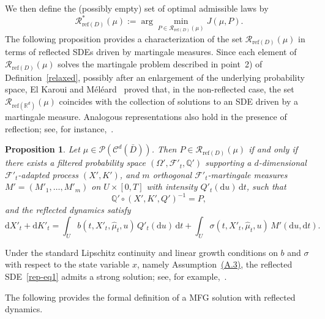 \documentclass[11pt,amsfonts]{article}
\theoremstyle{plain}
\newtheorem{proposition}{Proposition}
\theoremstyle{assumpstyle}
\numberwithin{equation}{section}
\numberwithin{theorem}{section}
\numberwithin{proposition}{section}
\numberwithin{definition}{section}
\numberwithin{remark}{section}
\numberwithin{corollary}{section}
\numberwithin{lemma}{section}
\begin{document}
\noindent We then define the (possibly empty) set of optimal admissible laws by
\begin{equation*}
\mathcal{R}_{\mathrm{ref}(D)}^*(\mu)
:= \arg\min_{P \in \mathcal{R}_{\mathrm{ref}(D)}(\mu)} J(\mu, P).
\end{equation*}
The following proposition provides a characterization of the set $\mathcal{R}_{\mathrm{ref}(D)}(\mu)$ in terms of reflected SDEs driven by martingale measures. Since each element of $\mathcal{R}_{\mathrm{ref}(D)}(\mu)$ solves the martingale problem described in point~2) of Definition~\ref{relaxed}, possibly after an enlargement of the underlying probability space, El Karoui and Méléard~\cite{Mel} proved that, in the non-reflected case, the set $\mathcal{R}_{\mathrm{ref}(\mathbb{R}^d)}(\mu)$ coincides with the collection of solutions to an SDE driven by a martingale measure. Analogous representations also hold in the presence of reflection; see, for instance,~\cite{kushnerbook}.
\begin{proposition} \label{rep martingale for Reflected dynamics}
Let $\mu \in \mathcal{P}(\mathcal{C}^{d}(\bar D))$. 
Then $P \in \mathcal{R}_{\mathrm{ref}(D)}(\mu)$ if and only if there exists a filtered probability space 
$(\Omega', \mathcal{F}'_t, \mathbb{Q}')$
supporting a $d$-dimensional $\mathcal{F}'_t$-adapted process $(X', K')$, 
and $m$ orthogonal $\mathcal{F}'_t$-martingale measures 
$M' = (M'_1, \ldots, M'_m)$ on $U \times [0, T]$ with intensity $Q'_t(\mathrm{d}u)\, \mathrm{d}t$, such that
\begin{equation*}
\mathbb{Q}' \circ (X', K', Q')^{-1} = P,
\end{equation*}
and the reflected dynamics satisfy
\begin{equation} \label{rep-eq1}
\mathrm{d}X'_t+ \mathrm{d}K'_t 
= \displaystyle\int_U b(t, X'_t, \hat{\mu}_t, u)\, Q'_t(\mathrm{d}u)\, \mathrm{d}t
+ \displaystyle\int_U \sigma(t, X'_t, \hat{\mu}_t, u)\, M'(\mathrm{d}u, \mathrm{d}t)
. 
\end{equation}
\end{proposition}
Under the standard Lipschitz continuity and linear growth conditions on $b$ and $\sigma$ with respect to the state variable $x$, namely Assumption~\hyperlink{A.3}{(A.3)}, the reflected SDE~\eqref{rep-eq1} admits a strong solution; see, for example,~\cite{Ishii}.

The following provides the formal definition of a MFG solution with reflected dynamics.
\end{document}
